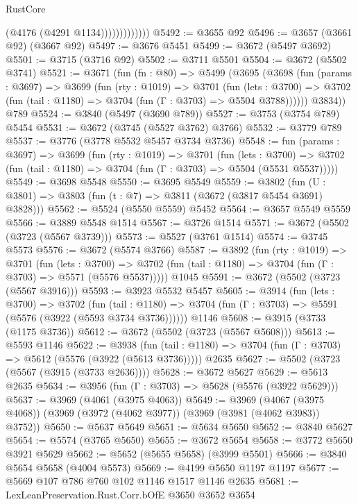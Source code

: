 \begin{lexlean}{RustCore}
\begin{coremodule}
                          (@4176 (@4291 @1134)))))))))))))
@5492 := @3655 @92
@5496 := @3657 (@3661 @92) (@3667 @92)
@5497 := @3676 @5451
@5499 := @3672 (@5497 @3692)
@5501 := @3715 (@3716 @92)
@5502 := @3711 @5501
@5504 := @3672 (@5502 @3741)
@5521 := @3671
    (fun (fn : @80) =>
    @5499
      (@3695
        (@3698
          (fun (params : @3697) =>
          @3699
            (fun (rty : @1019) =>
            @3701
              (fun (lets : @3700) =>
              @3702 (fun (tail : @1180) => @3704 (fun (Γ : @3703) => @5504 @3788))))))
        @3834))
    @789
@5524 := @3840 (@5497 (@3690 @789))
@5527 := @3753 (@3754 @789) @5454
@5531 := @3672 (@3745 (@5527 @3762) @3766)
@5532 := @3779 @789
@5537 := @3776 (@3778 @5532 @5457 @3734 @3736)
@5548 := fun (params : @3697) =>
  @3699
    (fun (rty : @1019) =>
    @3701
      (fun (lets : @3700) =>
      @3702 (fun (tail : @1180) => @3704 (fun (Γ : @3703) => @5504 (@5531 @5537)))))
@5549 := @3698 @5548
@5550 := @3695 @5549
@5559 := @3802 (fun (U : @3801) => @3803 (fun (t : @7) => @3811 (@3672 (@3817 @5454 @3691) @3828)))
@5562 := @5524 (@5550 @5559) @5452
@5564 := @3657 @5549 @5559
@5566 := @3889 @5548 @1514
@5567 := @3726 @1514
@5571 := @3672 (@5502 (@3723 (@5567 @3739)))
@5573 := @5527 (@3761 @1514)
@5574 := @3745 @5573
@5576 := @3672 (@5574 @3766)
@5587 := @3892
    (fun (rty : @1019) =>
    @3701
      (fun (lets : @3700) =>
      @3702 (fun (tail : @1180) => @3704 (fun (Γ : @3703) => @5571 (@5576 @5537)))))
    @1045
@5591 := @3672 (@5502 (@3723 (@5567 @3916)))
@5593 := @3923 @5532 @5457
@5605 := @3914
    (fun (lets : @3700) =>
    @3702
      (fun (tail : @1180) => @3704 (fun (Γ : @3703) => @5591 (@5576 (@3922 (@5593 @3734 @3736))))))
    @1146
@5608 := @3915 (@3733 (@1175 @3736))
@5612 := @3672 (@5502 (@3723 (@5567 @5608)))
@5613 := @5593 @1146
@5622 := @3938
    (fun (tail : @1180) => @3704 (fun (Γ : @3703) => @5612 (@5576 (@3922 (@5613 @3736)))))
    @2635
@5627 := @5502 (@3723 (@5567 (@3915 (@3733 @2636))))
@5628 := @3672 @5627
@5629 := @5613 @2635
@5634 := @3956 (fun (Γ : @3703) => @5628 (@5576 (@3922 @5629)))
@5637 := @3969 (@4061 (@3975 @4063))
@5649 := @3969
    (@4067 (@3975 @4068))
    (@3969 (@3972 (@4062 @3977)) (@3969 (@3981 (@4062 @3983)) @3752))
@5650 := @5637 @5649
@5651 := @5634 @5650
@5652 := @3840 @5627
@5654 := @5574 (@3765 @5650)
@5655 := @3672 @5654
@5658 := @3772 @5650 @3921 @5629
@5662 := @5652 (@5655 @5658) (@3999 @5501)
@5666 := @3840 @5654 @5658 (@4004 @5573)
@5669 := @4199 @5650 @1197 @1197
@5677 := @5669 @107 @786 @760 @102 @1146 @1517 @1146 @2635
@5681 := LexLeanPreservation.Rust.Corr.bOfE @3650 @3652 @3654

\end{coremodule}
\end{lexlean}
